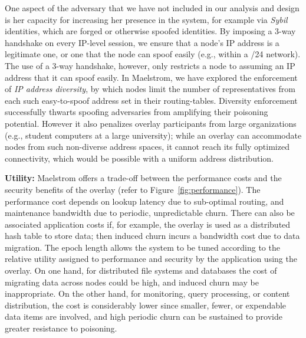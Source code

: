 \documentclass[10pt,twocolumn]{article}
\renewcommand{\paragraph}[1]{\textbf{#1:}}
\begin{document}
One aspect of the adversary that we have not included in our analysis and
design is her capacity for increasing her presence in the system, for
example via \emph{Sybil}
identities, which are forged or otherwise spoofed identities.
By imposing a 3-way handshake on every IP-level session, we  ensure
that a node's IP address is a legitimate one, or one that the node can
spoof easily (e.g., within a /24 network). The use of a 3-way handshake, however, only restricts a node to assuming an IP address that it can spoof easily. In Maelstrom, we
have explored the enforcement of \emph{IP address diversity}, by which nodes
limit the number of representatives from each such easy-to-spoof address
set in their routing-tables.  Diversity enforcement successfully thwarts spoofing
adversaries from amplifying their poisoning potential.  However it also
penalizes overlay participants from large organizations (e.g., student
computers at a large university);  while an overlay can accommodate
nodes from such non-diverse address spaces, it cannot reach its fully
optimized connectivity, which would be possible with a uniform address
distribution.

\paragraph{Utility}
Maelstrom offers a trade-off between the performance costs and the
security benefits of the overlay (refer to Figure~\ref{fig:performance}).
The performance cost depends
on lookup latency due to sub-optimal routing, and maintenance
bandwidth due to periodic, unpredictable churn.  There can also be
associated application costs if, for example, the overlay is used as a
distributed hash table to store data; then induced churn incurs a
bandwidth cost due to data migration. The epoch length allows
the system to be tuned according to the relative utility assigned to
performance and security by the
application using the overlay.  On one hand, 
for distributed file systems and databases the 
cost of migrating data
across nodes could be high, and induced churn
may be inappropriate. On the other hand, for
monitoring, query processing, or content distribution, the
cost is considerably lower since smaller, fewer, or expendable data items are
involved, and high periodic churn can be sustained to
provide greater resistance to poisoning.
\end{document}
